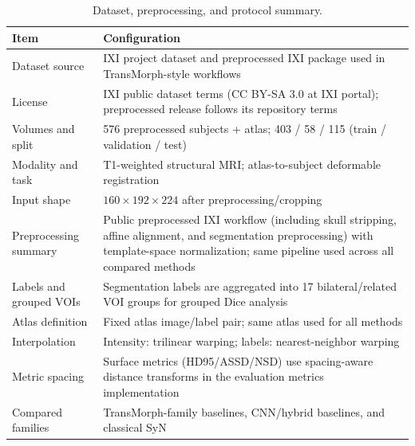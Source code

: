 \documentclass[11pt,a4paper]{article}
\begin{document}
\begin{table}[H]
\caption{Dataset, preprocessing, and protocol summary.\label{tab1}}
\begin{tabularx}{\textwidth}{lX}
\toprule
\textbf{Item} & \textbf{Configuration} \\
\midrule
Dataset source & IXI project dataset \citep{ixidataset} and preprocessed IXI package used in TransMorph-style workflows \\
License & IXI public dataset terms (CC BY-SA 3.0 at IXI portal); preprocessed release follows its repository terms \\
Volumes and split & 576 preprocessed subjects + atlas; 403 / 58 / 115 (train / validation / test) \\
Modality and task & T1-weighted structural MRI; atlas-to-subject deformable registration \\
Input shape & \(160 \times 192 \times 224\) after preprocessing/cropping \\
Preprocessing summary & Public preprocessed IXI workflow (including skull stripping, affine alignment, and segmentation preprocessing) with template-space normalization; same pipeline used across all compared methods \\
Labels and grouped VOIs & Segmentation labels are aggregated into 17 bilateral/related VOI groups for grouped Dice analysis \\
Atlas definition & Fixed atlas image/label pair; same atlas used for all methods \\
Interpolation & Intensity: trilinear warping; labels: nearest-neighbor warping \\
Metric spacing & Surface metrics (HD95/ASSD/NSD) use spacing-aware distance transforms in the evaluation metrics implementation \\
Compared families & TransMorph-family baselines, CNN/hybrid baselines, and classical SyN \\
\bottomrule
\end{tabularx}
\end{table}
\end{document}
